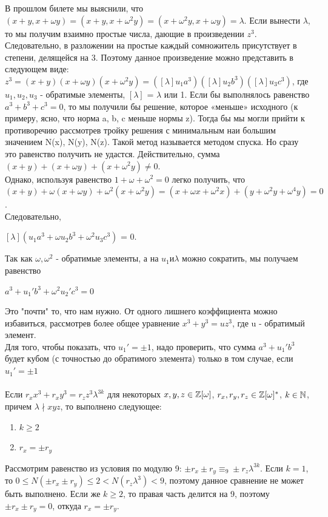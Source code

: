 В прошлом билете мы выяснили, что $(x + y, x + \omega y) = (x + y, x + \omega^2 y) = (x + \omega^2y, x + \omega y) = \lambda$. Если
 вынести $\lambda$, то мы получим взаимно простые числа, дающие в произведении $z^3$. Следовательно, в разложении на простые каждый сомножитель присутствует в степени, делящейся на 3. Поэтому данное произведение можно представить в следующем виде: $z^3 = (x + y)(x + \omega y)(x + \omega^2y) = ([\lambda]u_1a^3)([\lambda]u_2b^3)([\lambda]u_3c^3)$, где $u_1, u_2, u_3$ - обратимые элементы, $[\lambda]$ = $\lambda$ или 1.
Если бы выполнялось равенство $a^3 + b^3 + c^3 = 0$, то мы получили бы решение, которое «меньше» исходного (к примеру, ясно,
что норма a, b, c меньше нормы z). Тогда бы мы могли прийти к
противоречию рассмотрев тройку решения с минимальным наи
большим значением N(x), N(y), N(z). Такой метод называется методом спуска. Но сразу это равенство получить не удастся.
Действительно, сумма $(x + y) + (x + \omega y) + (x + \omega^2y) \neq 0$. 
\\
Однако, используя равенство $1 + \omega + \omega^2 = 0$ легко получить, что $(x+y)+\omega(x+\omega y)+\omega^2(x+\omega^2y) = (x+\omega x+\omega^2x)+(y+\omega^2y+\omega^4y) = 0$.\\
Следовательно,
\begin{center}
    $[\lambda](u_1a^3 + \omega u_2b^3 + \omega^2 u_3c^3)$ = 0.
\end{center}
Так как $\omega, \omega^2$ - обратимые элементы, а на $u_1 и \lambda$ можно сократить, мы получаем равенство
\begin{center}
    $a^3 +  u_1'b^3 +
     \omega^2 u_2'c^3 = 0$
\end{center}
Это "почти" то, что нам нужно. От одного лишнего коэффициента можно избавиться, рассмотрев более общее уравнение
$x^3 + y^3 = u z^3$, где u - обратимый элемент.
\\
Для того, чтобы показать, что $u_1' = \pm1$, надо проверить, что сумма  $a^3 +  u_1'b^3$ будет кубом (с точностью до обратимого элемента)
только в том случае, если $u_1' = \pm1$
\\
\\
\Lemma
	Если $r_xx^3 + r_xy^3 = r_zz^3\lambda^{3k}$ для некоторых $x, y, z \in \mathbb{Z}[\omega]$, $r_x, r_y, r_z \in \mathbb{Z}[\omega]^*$, $k \in \mathbb{N}$, причем $\lambda \nmid xyz$, то выполнено следующее:
	\begin{enumerate}
		\item $k \ge 2$
		\item $r_x = \pm r_y$
	\end{enumerate}


\Proof
	Рассмотрим равенство из условия по модулю 9: $\pm r_x \pm r_y \equiv_9 \pm r_z\lambda^{3k}$. Если $k = 1$, то $0 \le N(\pm r_x \pm r_y) \le 2 < N(r_z\lambda^{3})< 9$, поэтому данное сравнение не может быть выполнено. Если же $k \ge 2$, то правая часть делится на 9, поэтому $\pm r_x \pm r_y = 0$, откуда $r_x = \pm r_y$.
\EndProof

